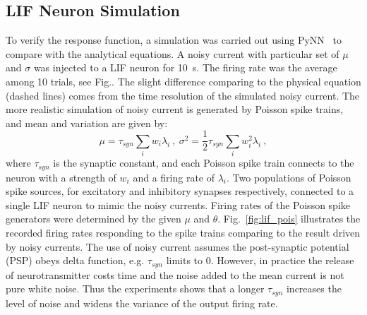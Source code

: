 \documentclass[runningheads,a4paper]{llncs}
\begin{document}
\subsection{LIF Neuron Simulation}
To verify the response function, a simulation was carried out using PyNN~\cite{davison2008pynn} to compare with the analytical equations.
A noisy current with particular set of $\mu$ and $\sigma$ was injected to a LIF neuron for 10~s.
The firing rate was the average among 10 trials, see Fig..
The slight difference comparing to the physical equation (dashed lines) comes from the time resolution of the simulated noisy current.
The more realistic simulation of noisy current is generated by Poisson spike trains, 
and mean and variation are given by:
\begin{equation}
\mu = \tau_{syn}\sum_i w_i\lambda_{i}~,~\sigma^2=\frac{1}{2}\tau_{syn}\sum_i w_i^2\lambda_{i}~,
\end{equation}
where $\tau_{syn}$ is the synaptic constant, and each Poisson spike train connects to the neuron with a strength of $w_i$ and a firing rate of $\lambda_i$.
Two populations of Poisson spike sources, for excitatory and inhibitory synapses respectively, connected to a single LIF neuron to mimic the noisy currents.
Firing rates of the Poisson spike generators were determined by the given $\mu$ and $\theta$.
Fig.~\ref{fig:lif_pois} illustrates the recorded firing rates responding to the spike trains comparing to the result driven by noisy currents.
The use of noisy current assumes the post-synaptic potential (PSP) obeys delta function, e.g. $\tau_{syn}$ limits to 0.
However, in practice the release of neurotransmitter costs time and the noise added to the mean current is not pure white noise.
Thus the experiments shows that a longer $\tau_{syn}$ increases the level of noise and widens the variance of the output firing rate.
\end{document}
